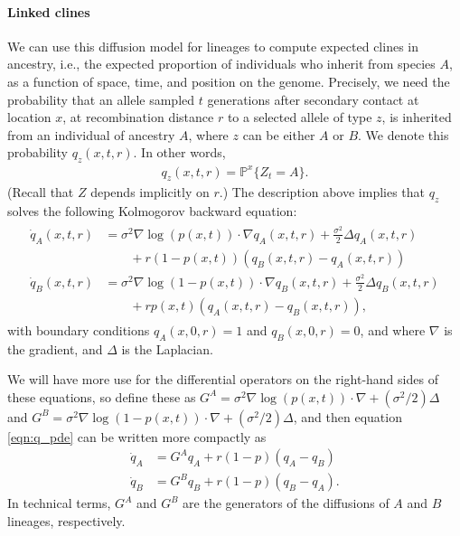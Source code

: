 \documentclass[11pt,letterpaper]{article}
\newcommand{\alisa}[1]{{\em \color{red} #1}}
\newcommand{\plr}[1]{{\em \color{blue} #1}}
\renewcommand{\P}{\mathbb{P}}
\newcommand{\grad}{\nabla}
\begin{document}
\paragraph{Linked clines}
We can use this diffusion model for lineages to compute expected clines in ancestry,
i.e., the expected proportion of individuals who inherit from species $A$,
as a function of space, time, and position on the genome.
Precisely, we need the probability that 
an allele sampled $t$ generations after secondary contact at location $x$,
at recombination distance $r$ to a selected allele of type $z$,
is inherited from an individual of ancestry $A$,
where $z$ can be either $A$ or $B$.
We denote this probability $q_z(x,t,r)$.
In other words,
\begin{align}
    q_z(x,t,r) = \P^x \{Z_t = A\} .
\end{align}
(Recall that $Z$ depends implicitly on $r$.)
The description above implies that $q_z$ solves the following Kolmogorov backward equation:
\begin{align}
    \begin{aligned}  \label{eqn:q_pde}
    \dot q_A(x,t,r) 
            &= \sigma^2 \grad \log(p(x,t)) \cdot \grad q_A(x,t,r) 
                + \frac{\sigma^2}{2} \Delta q_A(x,t,r) 
            \\ &\qquad {} + 
                r (1-p(x,t))(q_B(x,t,r)-q_A(x,t,r))  \\
    \dot q_B(x,t,r) &= \sigma^2 \grad \log(1-p(x,t)) \cdot \grad q_B(x,t,r) 
            + \frac{\sigma^2}{2} \Delta q_B(x,t,r)
            \\ &\qquad {} + 
            r p(x,t) (q_A(x,t,r)-q_B(x,t,r))  ,
    \end{aligned} 
\end{align}
with boundary conditions $q_A(x,0,r)=1$ and $q_B(x,0,r)=0$, 
and where $\grad$ is the gradient, and $\Delta$ is the Laplacian.

We will have more use for the differential operators on the right-hand sides of these equations,
so define these as
$G^A = \sigma^2 \grad \log(p(x,t)) \cdot \grad + (\sigma^2/2) \Delta$
and
$G^B = \sigma^2 \grad \log(1-p(x,t)) \cdot \grad + (\sigma^2/2) \Delta$,
and then equation \eqref{eqn:q_pde} can be written more compactly as
\begin{align*}
    \dot q_A &= G^A q_A + r (1-p) (q_A-q_B) \\
    \dot q_B &= G^B q_B + r (1-p) (q_B-q_A) .
\end{align*}
In technical terms, $G^A$ and $G^B$ are the generators of the diffusions of $A$ and $B$ lineages, respectively.
\end{document}
